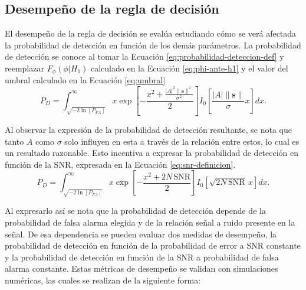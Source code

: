 \subsection{Desempeño de la regla de decisión}
\label{Ss:hipotesis-desempeño}
El desempeño de la regla de decisión se evalúa estudiando cómo se verá afectada la probabilidad de detección en función de los demás parámetros. La probabilidad de detección se conoce al tomar la Ecuación \ref{eq:probabilidad-deteccion-def} y reemplazar $F_\phi(\phi|H_1)$ calculado en la Ecuación \ref{eq:phi-ante-h1} y el valor del umbral calculado en la Ecuación \ref{eq:umbral}
\begin{equation}\label{eq:probabilidad-deteccion}
    P_D = \int_{\sqrt{-2 \ln\left[P_{FA}\right]}}^\infty x\exp\left[-\frac{x^2 + \frac{|A|^2\lVert\mathbf{s}\rVert^2}{\sigma^2}}{2}\right]I_0\left[\frac{|A|\lVert\mathbf{s}\rVert}{\sigma} x\right] dx.
\end{equation}

Al observar la expresión de la probabilidad de detección resultante, se nota que tanto $A$ como $\sigma$ solo influyen en esta a través de la relación entre estos, lo cual es un resultado razonable. Esto incentiva a expresar la probabilidad de detección en función de la SNR, expresada en la Ecuación \ref{eq:snr-definicion}.
\begin{equation}\label{eq:probabilidad-deteccion-snr}
    P_D = \int_{\sqrt{-2 \ln\left[P_{FA}\right]}}^\infty x\exp\left[-\frac{x^2 + 2N\,\text{SNR}}{2}\right]I_0\left[\sqrt{2N\,\text{SNR}}\,x\right] dx.
\end{equation}

Al expresarlo así se nota que la probabilidad de detección depende de la probabilidad de falsa alarma elegida y de la relación señal a ruido presente en la señal. De esa dependencia se pueden evaluar dos medidas de desempeño, la probabilidad de detección en función de la probabilidad de error a SNR constante y la probabilidad de detección en función de la SNR a probabilidad de falsa alarma constante. Estas métricas de desempeño se validan con simulaciones numéricas, las cuales se realizan de la siguiente forma:

